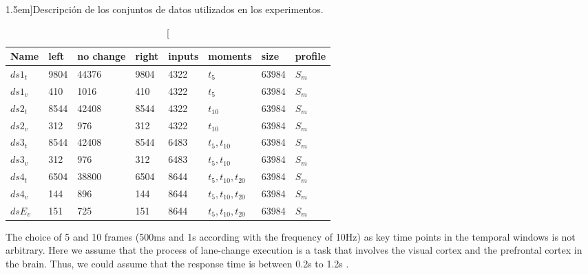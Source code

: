 {\begin{table}[t]
	\caption[Resúmen de información extraída del vehículo instrumentado][1.5em]{Descripción de los conjuntos de datos utilizados en los experimentos.}
	\label{tbl:data-sets-description}
	\begin{tabular}{llllllll}
		\toprule
		Name & left & no change & right & inputs & moments & size & profile \\
		\midrule
		$ds1_t$ & 9804 & 44376 & 9804 & 4322 & $t_5$ & 63984 & $S_m$ \\
		$ds1_v$ & 410 & 1016 & 410 & 4322 & $t_5$ & 63984 & $S_m$ \\
		$ds2_t$ & 8544 & 42408 & 8544 & 4322 & $t_{10}$ & 63984 & $S_m$ \\
		$ds2_v$ & 312 & 976 & 312 & 4322 & $t_{10}$ & 63984 & $S_m$ \\
		$ds3_t$ & 8544 & 42408 & 8544 & 6483 & $t_5, t_{10}$ & 63984 & $S_m$ \\
		$ds3_v$ & 312 & 976 & 312 & 6483 & $t_5, t_{10}$ & 63984 & $S_m$ \\
		$ds4_t$ & 6504 & 38800 & 6504 & 8644 & $t_5, t_{10}, t_{20}$ & 63984 & $S_m$ \\
		$ds4_v$ & 144 & 896 & 144 & 8644 & $t_5, t_{10}, t_{20}$ & 63984 & $S_m$ \\
		$dsE_v$ & 151 & 725 & 151 & 8644 & $t_5, t_{10}, t_{20}$ & 63984 & $S_m$ \\
		\bottomrule
	\end{tabular}
\end{table}

The choice of 5 and 10 frames (500ms and 1s according with the frequency of 10Hz) as key time points in the temporal windows is not arbitrary. Here we assume that the process of lane-change execution is a task that involves the visual cortex and the prefrontal cortex in the brain. Thus, we could assume that the response time is between 0.2s to 1.2s \cite{lipton2015critical}.

}

